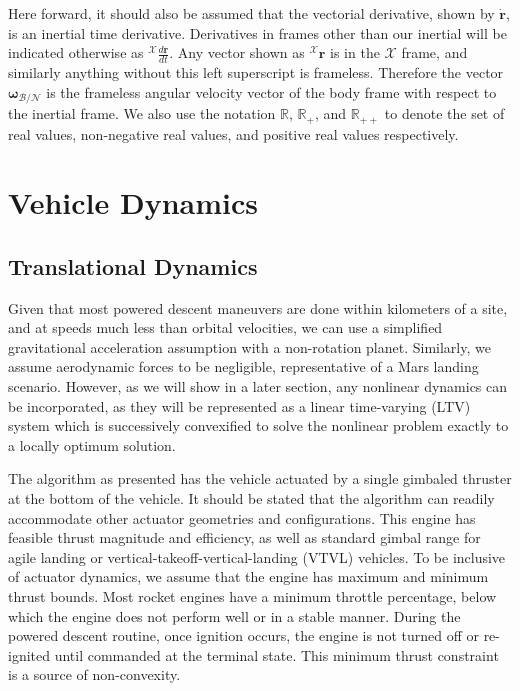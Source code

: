 Here forward, it should also be assumed that the vectorial derivative, shown by $\mathbf{\dot{r}}$, is an inertial time derivative. Derivatives in frames other than our inertial will be indicated otherwise as $^\mathcal{X}\frac{d \mathbf{r}}{dt}$. Any vector shown as $^\mathcal{X}\mathbf{r}$ is in the $\mathcal{X}$ frame, and similarly anything without this left superscript is frameless. Therefore the vector $\bm{\omega}_{\mathcal{B/N}}$ is the frameless angular velocity vector of the body frame with respect to the inertial frame. We also use the notation $\mathbb{R}$, $\mathbb{R}_+$, and $\mathbb{R}_{++}$ to denote the set of real values, non-negative real values, and positive real values respectively.


\section{Vehicle Dynamics}
\subsection{Translational Dynamics}
Given that most powered descent maneuvers are done within kilometers of a site, and at speeds much less than orbital velocities, we can use a simplified gravitational acceleration assumption with a non-rotation planet. Similarly, we assume aerodynamic forces to be negligible, representative of a Mars landing scenario. However, as we will show in a later section, any nonlinear dynamics can be incorporated, as they will be represented as a linear time-varying (LTV) system which is successively convexified to solve the nonlinear problem exactly to a locally optimum solution.

The algorithm as presented has the vehicle actuated by a single gimbaled thruster at the bottom of the vehicle. It should be stated that the algorithm can readily accommodate other actuator geometries and configurations. This engine has feasible thrust magnitude and efficiency, as well as standard gimbal range for agile landing or vertical-takeoff-vertical-landing (VTVL) vehicles. To be inclusive of actuator dynamics, we assume that the engine has maximum and minimum thrust bounds. Most rocket engines have a minimum throttle percentage, below which the engine does not perform well or in a stable manner. During the powered descent routine, once ignition occurs, the engine is not turned off or re-ignited until commanded at the terminal state. This minimum thrust constraint is a source of non-convexity.

